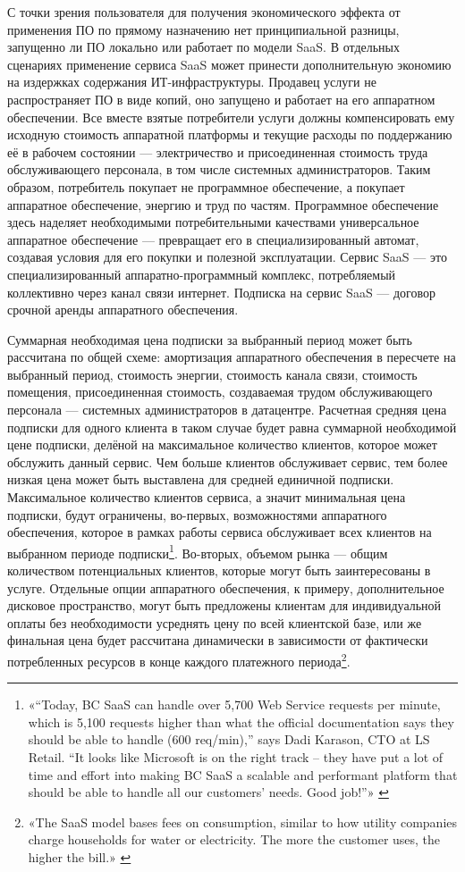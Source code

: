 \documentclass{article}
\begin{document}
С точки зрения пользователя для получения экономического эффекта от применения ПО по прямому назначению нет принципиальной разницы, запущенно ли ПО локально или работает по модели SaaS. В отдельных сценариях применение сервиса SaaS может принести дополнительную экономию на издержках содержания ИТ-инфраструктуры. Продавец услуги не распространяет ПО в виде копий, оно запущено и работает на его аппаратном обеспечении. Все вместе взятые потребители услуги должны компенсировать ему исходную стоимость аппаратной платформы и текущие расходы по поддержанию её в рабочем состоянии — электричество и присоединенная стоимость труда обслуживающего персонала, в том числе системных администраторов. Таким образом, потребитель покупает не программное обеспечение, а покупает аппаратное обеспечение, энергию и труд по частям. Программное обеспечение здесь наделяет необходимыми потребительными качествами универсальное аппаратное обеспечение — превращает его в специализированный автомат, создавая условия для его покупки и полезной эксплуатации. Сервис SaaS — это специализированный аппаратно-программный комплекс, потребляемый коллективно через канал связи интернет. Подписка на сервис SaaS — договор срочной аренды аппаратного обеспечения. 

Суммарная необходимая цена подписки за выбранный период может быть рассчитана по общей схеме: амортизация аппаратного обеспечения в пересчете на выбранный период, стоимость энергии, стоимость канала связи, стоимость помещения, присоединенная стоимость, создаваемая трудом обслуживающего персонала — системных администраторов в датацентре. Расчетная средняя цена подписки для одного клиента в таком случае будет равна суммарной необходимой цене подписки, делёной на максимальное количество клиентов, которое может обслужить данный сервис. Чем больше клиентов обслуживает сервис, тем более низкая цена может быть выставлена для средней единичной подписки. Максимальное количество клиентов сервиса, а значит минимальная цена подписки, будут ограничены, во-первых, возможностями аппаратного обеспечения, которое в рамках работы сервиса обслуживает всех клиентов на выбранном периоде подписки\footnote{«“Today, BC SaaS can handle over 5,700 Web Service requests per minute, which is 5,100 requests higher than what the official documentation says they should be able to handle (600 req/min),” says Dadi Karason, CTO at LS Retail. “It looks like Microsoft is on the right track – they have put a lot of time and effort into making BC SaaS a scalable and performant platform that should be able to handle all our customers’ needs. Good job!”» \cite{erpSaas}}. Во-вторых, объемом рынка — общим количеством потенциальных клиентов, которые могут быть заинтересованы в услуге. Отдельные опции аппаратного обеспечения, к примеру, дополнительное дисковое пространство, могут быть предложены клиентам для индивидуальной оплаты без необходимости усреднять цену по всей клиентской базе, или же финальная цена будет рассчитана динамически в зависимости от фактически потребленных ресурсов в конце каждого платежного периода\footnote{«The SaaS model bases fees on consumption, similar to how utility companies charge households for water or electricity. The more the customer uses, the higher the bill.» \cite{sellingServices}}.
\end{document}
